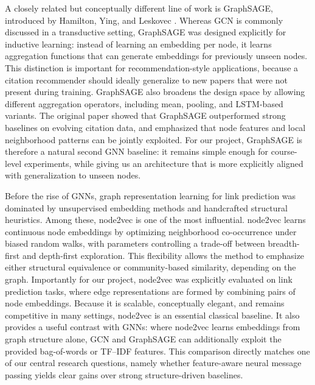 \documentclass[11pt,a4paper]{article}
\begin{document}
A closely related but conceptually different line of work is GraphSAGE,
introduced by Hamilton, Ying, and Leskovec \cite{hamilton2017inductive}.
Whereas GCN is commonly discussed in a transductive setting,
GraphSAGE was designed explicitly for inductive learning:
instead of learning an embedding per node,
it learns aggregation functions that can generate embeddings for previously unseen nodes.
This distinction is important for recommendation-style applications,
because a citation recommender should ideally generalize to new papers
that were not present during training.
GraphSAGE also broadens the design space by allowing different aggregation operators,
including mean, pooling, and LSTM-based variants.
The original paper showed that GraphSAGE outperformed strong baselines on evolving citation data,
and emphasized that node features and local neighborhood patterns can be jointly exploited.
For our project, GraphSAGE is therefore a natural second GNN baseline:
it remains simple enough for course-level experiments,
while giving us an architecture that is more explicitly aligned with generalization to unseen nodes.

Before the rise of GNNs, graph representation learning for link prediction
was dominated by unsupervised embedding methods and handcrafted structural heuristics.
Among these, node2vec \cite{grover2016node2vec} is one of the most influential.
node2vec learns continuous node embeddings by optimizing neighborhood co-occurrence
under biased random walks, with parameters controlling a trade-off between breadth-first
and depth-first exploration.
This flexibility allows the method to emphasize either structural equivalence
or community-based similarity, depending on the graph.
Importantly for our project, node2vec was explicitly evaluated on link prediction tasks,
where edge representations are formed by combining pairs of node embeddings.
Because it is scalable, conceptually elegant, and remains competitive in many settings,
node2vec is an essential classical baseline.
It also provides a useful contrast with GNNs:
where node2vec learns embeddings from graph structure alone,
GCN and GraphSAGE can additionally exploit the provided bag-of-words or TF--IDF features.
This comparison directly matches one of our central research questions,
namely whether feature-aware neural message passing yields clear gains
over strong structure-driven baselines.
\end{document}
